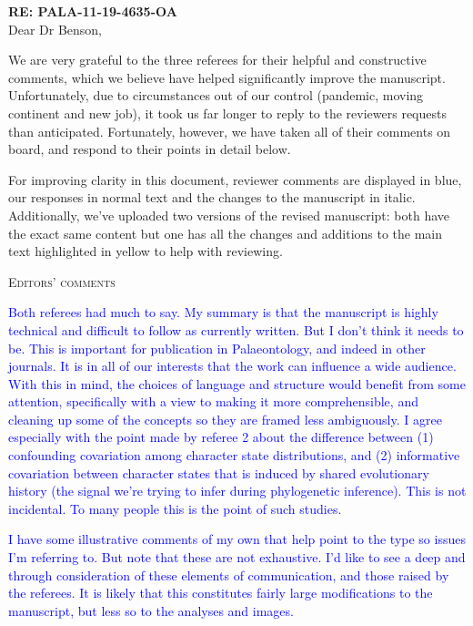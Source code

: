 \documentclass[12pt,letterpaper]{article}
\renewcommand{\section}[1]{%
\bigskip
\begin{center}
\begin{Large}
\normalfont\scshape #1
\medskip
\end{Large}
\end{center}}
\begin{document}
\textbf{RE: PALA-11-19-4635-OA}\\
\bigskip
Dear Dr Benson,\\
\bigskip

We are very grateful to the three referees for their helpful and constructive comments, which we believe have helped significantly improve the manuscript.
Unfortunately, due to circumstances out of our control (pandemic, moving continent and new job), it took us far longer to reply to the reviewers requests than anticipated.
Fortunately, however, we have taken all of their comments on board, and respond to their points in detail below.

For improving clarity in this document, reviewer comments are displayed in blue, our responses in normal text and the changes to the manuscript in italic.
Additionally, we've uploaded two versions of the revised manuscript: both have the exact same content but one has all the changes and additions to the main text highlighted in yellow to help with reviewing.


\section{Editors' comments}

\textcolor{blue}{Both referees had much to say. My summary is that the manuscript is highly technical and difficult to follow as currently written. But I don't think it needs to be. This is important for publication in Palaeontology, and indeed in other journals. It is in all of our interests that the work can influence a wide audience. With this in mind, the choices of language and structure would benefit from some attention, specifically with a view to making it more comprehensible, and cleaning up some of the concepts so they are framed less ambiguously. I agree especially with the point made by referee 2 about the difference between (1) confounding covariation among character state distributions, and (2) informative covariation between character states that is induced by shared evolutionary history (the signal we're trying to infer during phylogenetic inference). This is not incidental. To many people this is the point of such studies.}

\textcolor{blue}{I have some illustrative comments of my own that help point to the type so issues I'm referring to. But note that these are not exhaustive. I'd like to see a deep and through consideration of these elements of communication, and those raised by the referees. It is likely that this constitutes fairly large modifications to the manuscript, but less so to the analyses and images.}
\end{document}
